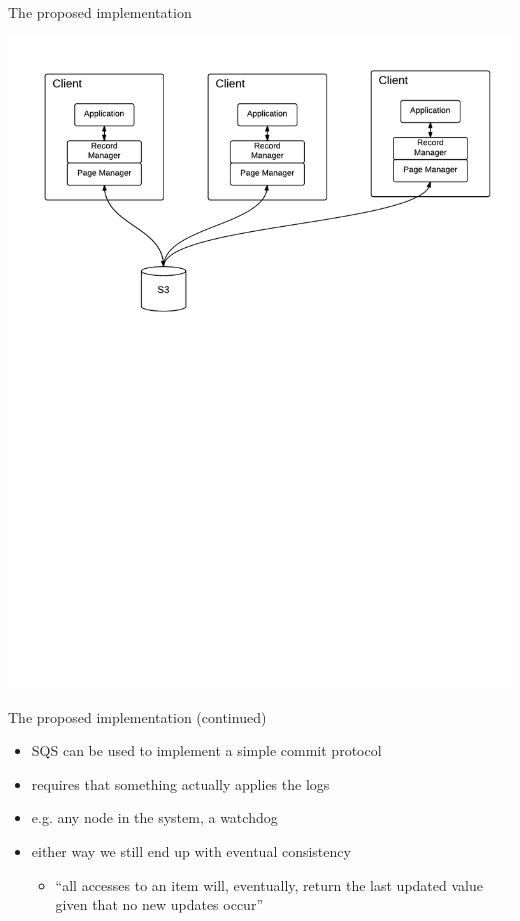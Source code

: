 \documentclass{beamer}
\begin{document}
  \begin{frame}{The proposed implementation}
    \begin{center}
      \includegraphics[width=\linewidth]{img/ADB arch 3.pdf}
    \end{center}
  \end{frame}

  \begin{frame}{The proposed implementation (continued)}
    \begin{itemize}
    \item
      SQS can be used to implement a simple commit protocol
    \item
      requires that something actually applies the logs
    \item
      e.g. any node in the system, a watchdog 
    \item
      either way we still end up with eventual consistency
      \begin{itemize}
      \item
        ``all accesses to an item will, eventually, return the last updated value given that no new updates occur''
      \end{itemize}
    \end{itemize}
  \end{frame}
\end{document}
